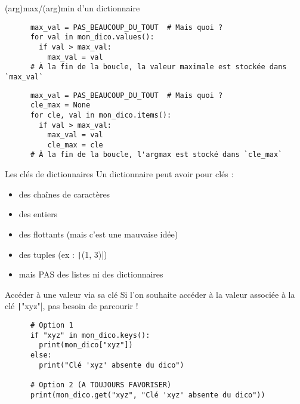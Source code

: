 \documentclass[10pt]{beamer}
\begin{document}
\begin{frame}[fragile]{(arg)max/(arg)min d'un dictionnaire}
  \begin{beamercodeblock}
    \begin{verbatim}
      max_val = PAS_BEAUCOUP_DU_TOUT  # Mais quoi ?
      for val in mon_dico.values():
        if val > max_val:
          max_val = val
      # À la fin de la boucle, la valeur maximale est stockée dans `max_val`
    \end{verbatim}
  \end{beamercodeblock}

  \pause
  
  \begin{beamercodeblock}
    \begin{verbatim}
      max_val = PAS_BEAUCOUP_DU_TOUT  # Mais quoi ?
      cle_max = None
      for cle, val in mon_dico.items():
        if val > max_val:
          max_val = val
          cle_max = cle
      # À la fin de la boucle, l'argmax est stocké dans `cle_max`
    \end{verbatim}
  \end{beamercodeblock}
\end{frame}

\begin{frame}[fragile]{Les clés de dictionnaires}
  Un dictionnaire peut avoir pour clés :
  \begin{itemize}
    \item des chaînes de caractères
    \item des entiers
    \item des flottants (mais c'est une mauvaise idée)
    \item des tuples (ex : \texttt|(1, 3)|)
    \item \alert{mais PAS des listes ni des dictionnaires}
  \end{itemize}
\end{frame}

\begin{frame}[fragile]{Accéder à une valeur via sa clé}
  Si l'on souhaite accéder à la valeur associée à la clé \texttt|"xyz"|, pas besoin de parcourir !

  \pause
  
  \begin{beamercodeblock}
    \begin{verbatim}
      # Option 1
      if "xyz" in mon_dico.keys():
        print(mon_dico["xyz"])
      else:
        print("Clé 'xyz' absente du dico")

      # Option 2 (A TOUJOURS FAVORISER)
      print(mon_dico.get("xyz", "Clé 'xyz' absente du dico"))
    \end{verbatim}
  \end{beamercodeblock}

\end{frame}
\end{document}
